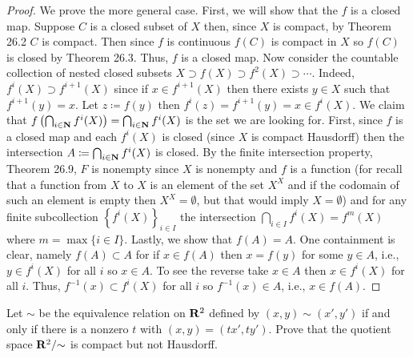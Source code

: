 \begin{proof}
We prove the more general case. First, we will show that the $f$ is a
closed map. Suppose $C$ is a closed subset of $X$ then, since $X$ is
compact, by Theorem 26.2 $C$ is compact. Then since $f$ is continuous
$f(C)$ is compact in $X$ so $f(C)$ is closed by Theorem 26.3. Thus, $f$ is
a closed map. Now consider the countable collection of nested closed
subsets $X\supset f(X)\supset f^2(X)\supset\cdots$. Indeed, $f^i(X)\supset
f^{i+1}(X)$ since if $x\in f^{i+1}(X)$ then there exists $y\in X$ such that
$f^{i+1}(y)=x$. Let $z\coloneqq f(y)$ then $f^i(z)=f^{i+1}(y)=x\in
f^i(X)$. We claim that
$f\left(\bigcap_{i\in\mathbf{N}}f^i(X)\right)=\bigcap_{i\in\mathbf{N}}f^{i}(X)$ is the
set we are looking for. First, since $f$ is a closed map and each $f^i(X)$
is closed (since $X$ is compact Hausdorff) then the intersection
$A\coloneqq\bigcap_{i\in\mathbf{N}} f^i(X)$ is closed. By the finite intersection
property, Theorem 26.9, $F$ is nonempty since $X$ is nonempty and $f$ is a
function (for recall that a function from $X$ to $X$ is an element of the
set $X^X$ and if the codomain of such an element is empty then
$X^X=\emptyset$, but that would imply $X=\emptyset$) and for any finite
subcollection $\left\{f^i(X)\right\}_{i\in I}$ the intersection
$\bigcap_{i\in I}f^i(X)=f^m(X)$ where $m=\max\{i\in I\}$. Lastly, we show
that $f(A)=A$. One containment is clear, namely
$f\left(A\right)\subset A$ for if $x\in f(A)$ then $x=f(y)$ for some $y\in
A$, i.e., $y\in f^i(X)$ for all $i$ so $x\in A$. To see the reverse take
$x\in A$ then $x\in f^i(X)$ for all $i$. Thus, $f^{-1}(x)\subset f^i(X)$
for all $i$ so $f^{-1}(x)\in A$, i.e., $x\in f(A)$.
\end{proof}
\begin{problem}
Let $\sim$ be the equivalence relation on $\mathbf{R}^2$ defined by
$(x,y)\sim(x',y')$ if and only if there is a nonzero $t$ with
$(x,y)=(tx',ty')$. Prove that the quotient space $\mathbf{R}^2/{\sim}$
is compact but not Hausdorff.
\end{problem}
